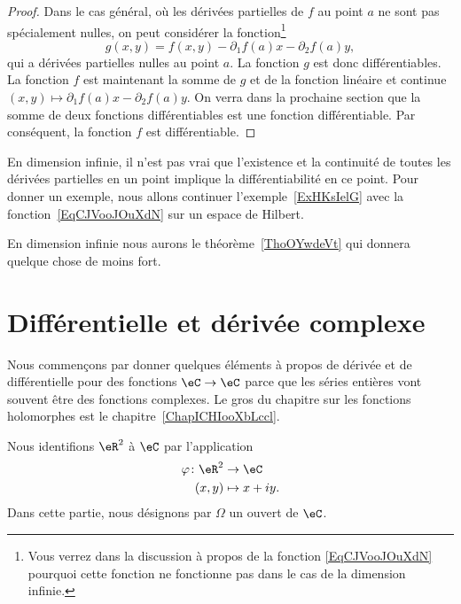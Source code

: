 \begin{proof}
    Dans le cas général, où les dérivées partielles de $f$ au point $a$ ne sont pas spécialement nulles, on peut considérer la fonction\footnote{Vous verrez dans la discussion à propos de la fonction \eqref{EqCJVooJOuXdN} pourquoi cette fonction ne fonctionne pas dans le cas de la dimension infinie.}
    \begin{equation}    \label{EqXHVooJeQKrB}
        g(x,y)=f(x,y)-\partial_1 f(a)x-\partial_2 f(a)y,
    \end{equation}
    qui a dérivées partielles nulles au point $a$. La fonction $g$ est donc différentiables. La fonction $f$ est maintenant la somme de $g$ et de la fonction linéaire et continue $(x,y)\mapsto \partial_1 f(a)x-\partial_2 f(a)y$. On verra dans la prochaine section que la somme de deux fonctions différentiables est une fonction différentiable. Par conséquent, la fonction $f$ est différentiable.
\end{proof}

\begin{remark}
    En dimension infinie, il n'est pas vrai que l'existence et la continuité de toutes les dérivées partielles en un point implique la différentiabilité en ce point. Pour donner un exemple, nous allons continuer l'exemple~\ref{ExHKsIelG}
    avec la fonction~\ref{EqCJVooJOuXdN} sur un espace de Hilbert.

    En dimension infinie nous aurons le théorème~\ref{ThoOYwdeVt} qui donnera quelque chose de moins fort.
\end{remark}

\section{Différentielle et dérivée complexe}
\label{SECooJWNOooOgMiWR}

\begin{normaltext}
    Nous commençons par donner quelques éléments à propos de dérivée et de différentielle pour des fonctions \( \eC\to \eC\) parce que les séries entières vont souvent être des fonctions complexes. Le gros du chapitre sur les fonctions holomorphes est le chapitre~\ref{ChapICHIooXbLccl}.
\end{normaltext}

Nous identifions \( \eR^2\) à \( \eC\) par l'application
\begin{equation}
    \begin{aligned}
        \varphi\colon \eR^2&\to \eC \\
        (x,y)&\mapsto x+iy.
    \end{aligned}
\end{equation}
Dans cette partie, nous désignons par \( \Omega\) un ouvert de \( \eC\).

